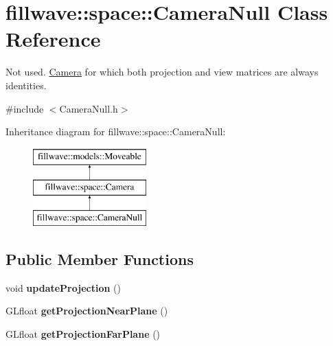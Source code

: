 \hypertarget{classfillwave_1_1space_1_1CameraNull}{}\section{fillwave\+:\+:space\+:\+:Camera\+Null Class Reference}
\label{classfillwave_1_1space_1_1CameraNull}


Not used. \hyperlink{classfillwave_1_1space_1_1Camera}{Camera} for which both projection and view matrices are always identities.  




{\ttfamily \#include $<$Camera\+Null.\+h$>$}

Inheritance diagram for fillwave\+:\+:space\+:\+:Camera\+Null\+:\begin{figure}[H]
\begin{center}
\leavevmode
\includegraphics[height=3.000000cm]{classfillwave_1_1space_1_1CameraNull}
\end{center}
\end{figure}
\subsection*{Public Member Functions}
\begin{DoxyCompactItemize}
\item 
\hypertarget{classfillwave_1_1space_1_1CameraNull_a5166bbcf48ec9e4b7307e0a884060418}{}void {\bfseries update\+Projection} ()\label{classfillwave_1_1space_1_1CameraNull_a5166bbcf48ec9e4b7307e0a884060418}

\item 
\hypertarget{classfillwave_1_1space_1_1CameraNull_a8209d47b332935bbe48d9de9355daecb}{}G\+Lfloat {\bfseries get\+Projection\+Near\+Plane} ()\label{classfillwave_1_1space_1_1CameraNull_a8209d47b332935bbe48d9de9355daecb}

\item 
\hypertarget{classfillwave_1_1space_1_1CameraNull_aa2d4f17a7adf55046699b6a119fb5934}{}G\+Lfloat {\bfseries get\+Projection\+Far\+Plane} ()\label{classfillwave_1_1space_1_1CameraNull_aa2d4f17a7adf55046699b6a119fb5934}

\end{DoxyCompactItemize}
